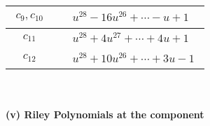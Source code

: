 \documentclass[1p]{elsarticle_modified}
\theoremstyle{definition}
\begin{document}
\begin{tabular}{m{50pt}|m{274pt}}
\hline $$\begin{aligned}c_{9},c_{10}\end{aligned}$$&$\begin{aligned}
&u^{28}-16 u^{26}+\cdots- u+1
\end{aligned}$\\
\hline $$\begin{aligned}c_{11}\end{aligned}$$&$\begin{aligned}
&u^{28}+4 u^{27}+\cdots+4 u+1
\end{aligned}$\\
\hline $$\begin{aligned}c_{12}\end{aligned}$$&$\begin{aligned}
&u^{28}+10 u^{26}+\cdots+3 u-1
\end{aligned}$\\
\hline
\end{tabular}\\~\\
\newpage\renewcommand{\arraystretch}{1}
\flushleft \textbf{(v) Riley Polynomials at the component}\newline \\
\end{document}
